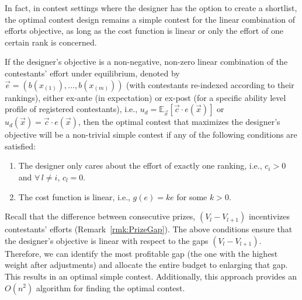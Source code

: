 In fact, in contest settings where the designer has the option to create a shortlist, the optimal contest design remains a simple contest for the linear combination of efforts objective, as long as the cost function is linear or only the effort of one certain rank is concerned. %


\begin{proposition}\label{prop:DesignGuideline}
    If the designer's objective is a non-negative, non-zero linear combination of the contestants' effort under equilibrium, denoted by $\vec{e}=(b(x_{(1)}), \ldots,b(x_{(m)}))$ (with contestants re-indexed according to their rankings), either ex-ante (in expectation) or ex-post (for a specific ability level profile of registered contestants), i.e., $u_d=\mathbb{E}_{\vec{x}}[\vec{c}\cdot e(\vec{x})]$ or $u_d(\vec{x})=\vec{c}\cdot e(\vec{x})$, then the optimal contest that maximizes the designer's objective will be a non-trivial simple contest if any of the following conditions are satisfied:
    \begin{enumerate}
        \item The designer only cares about the effort of exactly one ranking, i.e., $c_i>0$ and $\forall \,l\neq i$, $c_l=0$.
        \item The cost function is linear, i.e., $g(e)=ke$ for some $k>0$.
    \end{enumerate}
\end{proposition}

Recall that the difference between consecutive prizes, $(V_l-V_{l+1})$ incentivizes contestants' efforts (Remark~\ref{rmk:PrizeGap}). The above conditions ensure that the designer's objective is linear with respect to the gaps $(V_l-V_{l+1})$. Therefore, we can identify the most profitable gap (the one with the highest weight after adjustments) and allocate the entire budget to enlarging that gap. This results in an optimal simple contest. Additionally, this approach provides an $O(n^2)$ algorithm for finding the optimal contest.

